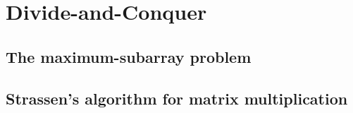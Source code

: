 \chapter{Divide-and-Conquer}
\section{The maximum-subarray problem}
\subsection{}

\subsection{}

\subsection{}

\subsection{}

\subsection{}

\section{Strassen's algorithm for matrix multiplication}
\subsection{}

\subsection{}

\subsection{}

\subsection{}

\subsection{}

\subsection{}

